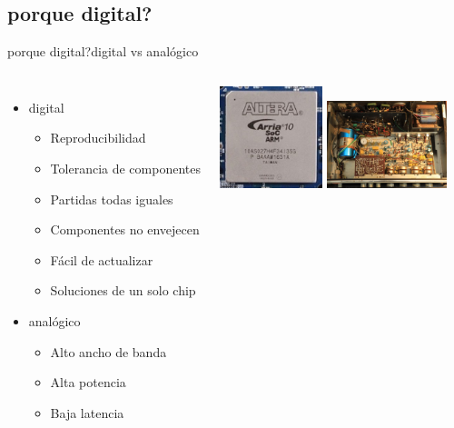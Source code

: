  \subsection{porque digital?}
 \begin{frame}{porque digital?}{digital vs analógico}
    \begin{columns}[onlytextwidth]
       \begin{itemize}
          \item{digital}
             \begin{itemize}
                \item{Reproducibilidad}
                \item{Tolerancia de componentes}
                \item{Partidas todas iguales}
                \item{Componentes no envejecen}
                \item{Fácil de actualizar}
                \item{Soluciones de un solo chip}
             \end{itemize}
          \item{analógico}
             \begin{itemize}
                \item{Alto ancho de banda}
                \item{Alta potencia}
                \item{Baja latencia}
             \end{itemize}
       \end{itemize}
       \includegraphics[width=30mm]{1_clase/fpga}
       \newline
       \includegraphics[width=35mm]{1_clase/transistor_amp}
    \end{columns}
 \end{frame}
